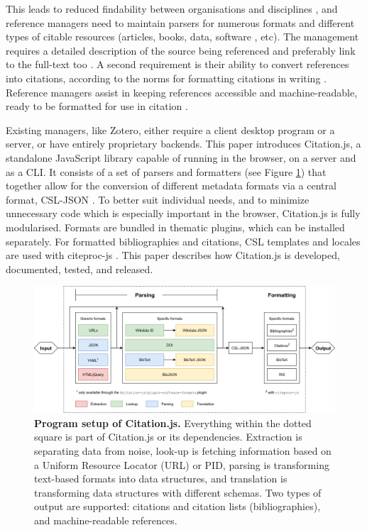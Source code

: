 \documentclass[fleqn,10pt,lineno]{wlpeerj} %
\begin{document}
This leads to reduced findability between organisations and disciplines \citep{godby_repository_2004,zinn_crosswalking_2016}, and reference managers need to maintain parsers for numerous formats and different types of citable resources (articles, books, data, software \citep{smith_software_2016}, etc). The management requires a detailed description of the source being referenced and preferably link to the full-text too \citep{hull_defrosting_2008}. A second requirement is their ability to convert references into citations, according to the norms for formatting citations in writing \citep{ron_gilmour_reference_2011}. Reference managers assist in keeping references accessible and machine-readable, ready to be formatted for use in citation \citep{fenner_reference_2014}.

Existing managers, like Zotero, either require a client desktop program or a server, or have entirely proprietary backends. This paper introduces Citation.js, a standalone JavaScript library capable of running in the browser, on a server and as a CLI. It consists of a set of parsers and formatters (see Figure \ref{fig:structure}) that together allow for the conversion of different metadata formats via a central format, CSL-JSON \citep{Bennett2018Juris-M/citeproc-js}. To better suit individual needs, and to minimize unnecessary code which is especially important in the browser, Citation.js is fully modularised. Formats are bundled in thematic plugins, which can be installed separately. For formatted bibliographies and citations, CSL templates and locales are used with citeproc-js \citep{zelle_csl_2012,Bennett2018Juris-M/citeproc-js}. This paper describes how Citation.js is developed, documented, tested, and released.

\begin{figure}[bt]
\centering
\includegraphics[width=\linewidth]{figures/Figure_1.png}
\caption{\textbf{Program setup of Citation.js.} Everything within the dotted square is part of Citation.js or its dependencies. Extraction is separating data from noise, look-up is fetching information based on a Uniform Resource Locator (URL) or PID, parsing is transforming text-based formats into data structures, and translation is transforming data structures with different schemas. Two types of output are supported: citations and citation lists (bibliographies), and machine-readable references.}
\label{fig:structure}
\end{figure}
\end{document}
